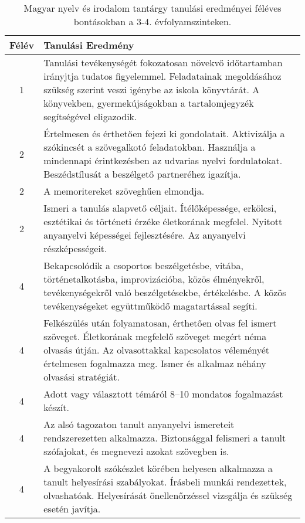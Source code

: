        
           \begin{longtable}{c | p{12cm} }
            \caption[Magyar nyelv és irodalom 3-4.]{Magyar nyelv és irodalom tantárgy tanulási eredményei féléves bontásokban a 3-4. évfolyamszinteken. }  \\

            \textbf{Félév} & \textbf{Tanulási Eredmény} \\
            \hline
            \endhead
                                
                                          1 &  Tanulási tevékenységét fokozatosan növekvő időtartamban irányjtja tudatos figyelemmel. Feladatainak megoldásához szükség szerint veszi igénybe az iskola könyvtárát. A könyvekben, gyermekújságokban a tartalomjegyzék segítségével eligazodik. \\ \hline
                                      
                                
                                          2 &  Értelmesen és érthetően fejezi ki gondolatait. Aktivizálja a szókincsét a szövegalkotó feladatokban. Használja a mindennapi érintkezésben az udvarias nyelvi fordulatokat. Beszédstílusát a beszélgető partneréhez igazítja. \\ \hline
                                          2 &  A memoritereket szöveghűen elmondja. \\ \hline
                                          2 &  Ismeri a tanulás alapvető céljait. Ítélőképessége, erkölcsi, esztétikai és történeti érzéke életkorának megfelel. Nyitott anyanyelvi képességei fejlesztésére. Az anyanyelvi részképességeit. \\ \hline
                                      
                                
                                          4 &  Bekapcsolódik a csoportos beszélgetésbe, vitába, történetalkotásba, improvizációba, közös élményekről, tevékenységekről való beszélgetésekbe, értékelésbe. A közös tevékenységeket együttműködő magatartással segíti. \\ \hline
                                          4 &  Felkészülés után folyamatosan, érthetően olvas fel ismert szöveget. Életkorának megfelelő szöveget megért néma olvasás útján. Az olvasottakkal kapcsolatos véleményét értelmesen fogalmazza meg. Ismer és alkalmaz néhány olvasási stratégiát. \\ \hline
                                          4 &  Adott vagy választott témáról 8–10 mondatos fogalmazást készít. \\ \hline
                                          4 &  Az alsó tagozaton tanult anyanyelvi ismereteit rendszerezetten alkalmazza. Biztonsággal felismeri a tanult szófajokat, és megnevezi azokat szövegben is. \\ \hline
                                          4 &  A begyakorolt szókészlet körében helyesen alkalmazza a tanult helyesírási szabályokat. Írásbeli munkái rendezettek, olvashatóak. Helyesírását önellenőrzéssel vizsgálja és szükség esetén javítja. \\ \hline
                                      
                        \end{longtable}
